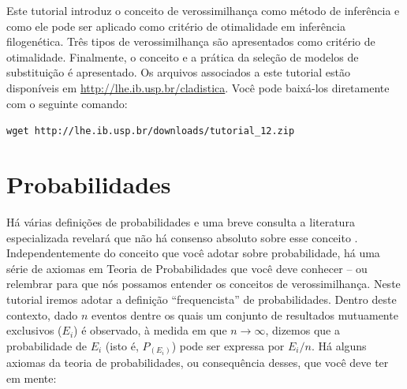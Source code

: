 \begin{refsection}
\renewcommand*{\finalnamedelim}{\addspace\&\space} %

Este tutorial introduz o conceito de verossimilhança como método de inferência e como ele pode ser aplicado como critério de otimalidade em inferência filogenética. Três tipos de verossimilhança são apresentados como critério de otimalidade. Finalmente, o conceito e a prática da seleção de modelos de substituição é apresentado. Os arquivos associados a este tutorial estão disponíveis em \url{http://lhe.ib.usp.br/cladistica}. Você pode baixá-los diretamente com o seguinte comando:

\begin{center}
\small \texttt{wget http://lhe.ib.usp.br/downloads/tutorial\_12.zip}\\
\end{center}


\newpage
\pagestyle{fancy} %
\newcommand{\A}{\textcolor{green}{\textbf{A}}}
\newcommand{\C}{\textcolor{blue}{\textbf{C}}}
\newcommand{\G}{\textcolor{gray}{\textbf{G}}}
\newcommand{\T}{\textcolor{red}{\textbf{T}}}
\newcommand{\gap}{\textcolor{black}{\textbf{-}}}


\section{Probabilidades}\label{tut12:probs}
Há várias definições de probabilidades e uma breve consulta a literatura especializada revelará que não há consenso absoluto sobre esse conceito \parencite[considere a leitura de][, anexo ao diretório do tutorial]{Thacker_2014}. Independentemente do conceito que você adotar sobre probabilidade, há uma série de axiomas em Teoria de Probabilidades que você deve conhecer -- ou relembrar para que nós possamos entender os conceitos de verossimilhança. Neste tutorial iremos adotar a definição ``frequencista'' de probabilidades. Dentro deste contexto, dado $n$ eventos dentre os quais um conjunto de resultados mutuamente exclusivos ($E_{i}$) é observado, à medida em que $n \rightarrow \infty$, dizemos que a probabilidade de $E_{i}$ (isto é, $P_{(E_{i})}$) pode ser expressa por $E_{i}/n$. Há alguns axiomas da teoria de probabilidades, ou consequência desses, que você deve ter em mente:


\end{refsection}
